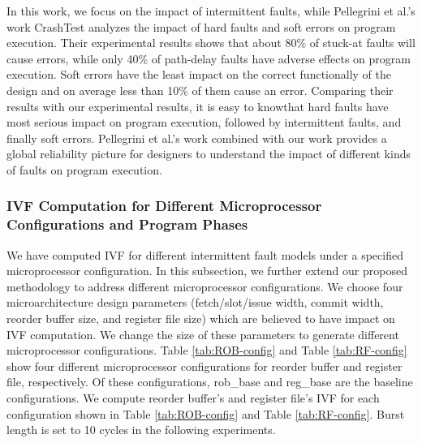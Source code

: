 In this work, we focus on the impact of intermittent faults, while Pellegrini et al.’s work CrashTest \cite{pellegrini2008crashtest} analyzes the impact of hard faults and soft errors on program execution. Their experimental results shows that about 80\% of stuck-at faults will cause errors, while only 40\% of path-delay faults have adverse effects on program execution. Soft errors have the least impact on the correct functionally of the design and on average less than 10\% of them cause an error. Comparing their results with our experimental results, it is easy to knowthat hard faults have most serious impact on program execution, followed by intermittent faults, and finally soft errors. Pellegrini et al.’s work combined with our work provides a global reliability picture for designers to understand the impact of different kinds of faults on program execution.

\subsubsection{IVF Computation for Different Microprocessor Configurations and Program Phases}
We have computed IVF for different intermittent fault models under a specified microprocessor configuration. In this subsection, we further extend our proposed methodology to address different microprocessor configurations. We choose four microarchitecture design parameters (fetch/slot/issue width, commit width, reorder buffer size, and register file size) which are believed to have impact on IVF computation. We change the size of these parameters to generate different microprocessor configurations. Table \ref{tab:ROB-config} and Table \ref{tab:RF-config} show four different microprocessor configurations for reorder buffer and register file, respectively. Of these configurations, rob\_base and reg\_base are the baseline configurations. We compute reorder buffer’s and register file’s IVF for each configuration shown in Table \ref{tab:ROB-config} and Table \ref{tab:RF-config}. Burst length is set to 10 cycles in the following experiments.

